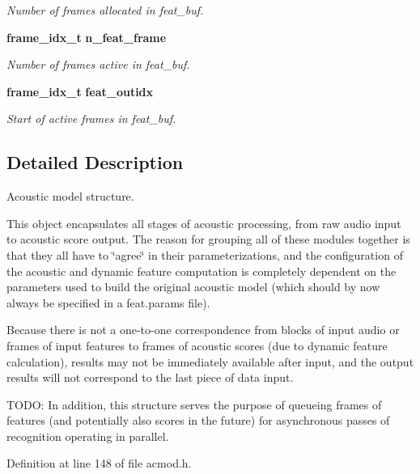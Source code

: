 \begin{DoxyCompactItemize}
\begin{DoxyCompactList}\small\item\em Number of frames allocated in feat\-\_\-buf. \end{DoxyCompactList}\item 
{\bf frame\-\_\-idx\-\_\-t} {\bf n\-\_\-feat\-\_\-frame}\label{structacmod__s_a861cc097befe7e81473f0ae0972186e0}

\begin{DoxyCompactList}\small\item\em Number of frames active in feat\-\_\-buf. \end{DoxyCompactList}\item 
{\bf frame\-\_\-idx\-\_\-t} {\bf feat\-\_\-outidx}\label{structacmod__s_ae15076737bcdcbe1d5b4226f7a0b3f5b}

\begin{DoxyCompactList}\small\item\em Start of active frames in feat\-\_\-buf. \end{DoxyCompactList}\end{DoxyCompactItemize}


\subsection{Detailed Description}
Acoustic model structure. 

This object encapsulates all stages of acoustic processing, from raw audio input to acoustic score output. The reason for grouping all of these modules together is that they all have to \char`\"{}agree\char`\"{} in their parameterizations, and the configuration of the acoustic and dynamic feature computation is completely dependent on the parameters used to build the original acoustic model (which should by now always be specified in a feat.\-params file).

Because there is not a one-\/to-\/one correspondence from blocks of input audio or frames of input features to frames of acoustic scores (due to dynamic feature calculation), results may not be immediately available after input, and the output results will not correspond to the last piece of data input.

T\-O\-D\-O\-: In addition, this structure serves the purpose of queueing frames of features (and potentially also scores in the future) for asynchronous passes of recognition operating in parallel. 

Definition at line 148 of file acmod.\-h.



